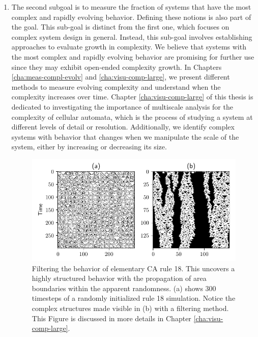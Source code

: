 \begin{enumerate}
  \item The second subgoal is to measure the fraction of systems that have the most complex and rapidly
        evolving behavior. Defining these notions is also part of the goal.
        This sub-goal is distinct from the first one, which focuses on complex system design in 
        general. Instead, this sub-goal involves establishing approaches to evaluate growth 
        in complexity.
        We believe that systems with the most complex and rapidly
        evolving behavior are promising for further use since
        they may exhibit open-ended complexity growth. In Chapters
        \ref{cha:meas-compl-evolv} and \ref{cha:visu-comp-large}, we present
        different methods to measure evolving complexity and understand when the
        complexity increases over time. Chapter \ref{cha:visu-comp-large} of this thesis is dedicated to investigating the importance of multiscale analysis for the complexity of
        cellular automata, which is the process of studying a system at different levels of detail or resolution.   Additionally, we identify complex systems with behavior that
        changes when we manipulate the scale of the system, either by increasing or decreasing its size.
\begin{figure}[htbp]
  \centering
 \includegraphics[width=.9\linewidth]{figures/rule18_small}
 \caption{Filtering the behavior of elementary \acl{CA} rule 18. This
   uncovers a highly structured behavior with the propagation of area boundaries
   within the apparent randomness. (a) shows 300 timesteps
of a randomly initialized rule 18 simulation. Notice the complex structures made
visible in (b) with a filtering method. This Figure is discussed in more details in Chapter \ref{cha:visu-comp-large}.}
  \label{fig:rule_18}
\end{figure}


\end{enumerate}
